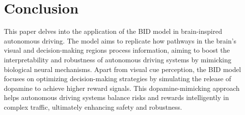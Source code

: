 \section{Conclusion}
\label{sec:conclusion}
\hspace{1pc}This paper delves into the application of the BID model in brain-inspired autonomous driving. 
The model aims to replicate how pathways in the brain's visual and decision-making regions process information, aiming to boost the interpretability and robustness of autonomous driving systems by mimicking biological neural mechanisms. 
Apart from visual cue perception, the BID model focuses on optimizing decision-making strategies by simulating the release of dopamine to achieve higher reward signals. 
This dopamine-mimicking approach helps autonomous driving systems balance risks and rewards intelligently in complex traffic, ultimately enhancing safety and robustness.